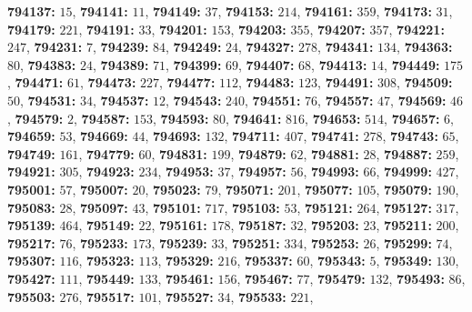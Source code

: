\textsf{\bfseries 794137:} $15$, \textsf{\bfseries 794141:} $11$, \textsf{\bfseries 794149:} $37$, \textsf{\bfseries 794153:} $214$, \textsf{\bfseries 794161:} $359$, \textsf{\bfseries 794173:} $31$, \textsf{\bfseries 794179:} $221$, \textsf{\bfseries 794191:} $33$, \textsf{\bfseries 794201:} $153$, \textsf{\bfseries 794203:} $355$, \textsf{\bfseries 794207:} $357$, \textsf{\bfseries 794221:} $247$, \textsf{\bfseries 794231:} $7$, \textsf{\bfseries 794239:} $84$, \textsf{\bfseries 794249:} $24$, \textsf{\bfseries 794327:} $278$, \textsf{\bfseries 794341:} $134$, \textsf{\bfseries 794363:} $80$, \textsf{\bfseries 794383:} $24$, \textsf{\bfseries 794389:} $71$, \textsf{\bfseries 794399:} $69$, \textsf{\bfseries 794407:} $68$, \textsf{\bfseries 794413:} $14$, \textsf{\bfseries 794449:} $175$, \textsf{\bfseries 794471:} $61$, \textsf{\bfseries 794473:} $227$, \textsf{\bfseries 794477:} $112$, \textsf{\bfseries 794483:} $123$, \textsf{\bfseries 794491:} $308$, \textsf{\bfseries 794509:} $50$, \textsf{\bfseries 794531:} $34$, \textsf{\bfseries 794537:} $12$, \textsf{\bfseries 794543:} $240$, \textsf{\bfseries 794551:} $76$, \textsf{\bfseries 794557:} $47$, \textsf{\bfseries 794569:} $46$, \textsf{\bfseries 794579:} $2$, \textsf{\bfseries 794587:} $153$, \textsf{\bfseries 794593:} $80$, \textsf{\bfseries 794641:} $816$, \textsf{\bfseries 794653:} $514$, \textsf{\bfseries 794657:} $6$, \textsf{\bfseries 794659:} $53$, \textsf{\bfseries 794669:} $44$, \textsf{\bfseries 794693:} $132$, \textsf{\bfseries 794711:} $407$, \textsf{\bfseries 794741:} $278$, \textsf{\bfseries 794743:} $65$, \textsf{\bfseries 794749:} $161$, \textsf{\bfseries 794779:} $60$, \textsf{\bfseries 794831:} $199$, \textsf{\bfseries 794879:} $62$, \textsf{\bfseries 794881:} $28$, \textsf{\bfseries 794887:} $259$, \textsf{\bfseries 794921:} $305$, \textsf{\bfseries 794923:} $234$, \textsf{\bfseries 794953:} $37$, \textsf{\bfseries 794957:} $56$, \textsf{\bfseries 794993:} $66$, \textsf{\bfseries 794999:} $427$, \textsf{\bfseries 795001:} $57$, \textsf{\bfseries 795007:} $20$, \textsf{\bfseries 795023:} $79$, \textsf{\bfseries 795071:} $201$, \textsf{\bfseries 795077:} $105$, \textsf{\bfseries 795079:} $190$, \textsf{\bfseries 795083:} $28$, \textsf{\bfseries 795097:} $43$, \textsf{\bfseries 795101:} $717$, \textsf{\bfseries 795103:} $53$, \textsf{\bfseries 795121:} $264$, \textsf{\bfseries 795127:} $317$, \textsf{\bfseries 795139:} $464$, \textsf{\bfseries 795149:} $22$, \textsf{\bfseries 795161:} $178$, \textsf{\bfseries 795187:} $32$, \textsf{\bfseries 795203:} $23$, \textsf{\bfseries 795211:} $200$, \textsf{\bfseries 795217:} $76$, \textsf{\bfseries 795233:} $173$, \textsf{\bfseries 795239:} $33$, \textsf{\bfseries 795251:} $334$, \textsf{\bfseries 795253:} $26$, \textsf{\bfseries 795299:} $74$, \textsf{\bfseries 795307:} $116$, \textsf{\bfseries 795323:} $113$, \textsf{\bfseries 795329:} $216$, \textsf{\bfseries 795337:} $60$, \textsf{\bfseries 795343:} $5$, \textsf{\bfseries 795349:} $130$, \textsf{\bfseries 795427:} $111$, \textsf{\bfseries 795449:} $133$, \textsf{\bfseries 795461:} $156$, \textsf{\bfseries 795467:} $77$, \textsf{\bfseries 795479:} $132$, \textsf{\bfseries 795493:} $86$, \textsf{\bfseries 795503:} $276$, \textsf{\bfseries 795517:} $101$, \textsf{\bfseries 795527:} $34$, \textsf{\bfseries 795533:} $221$, 
